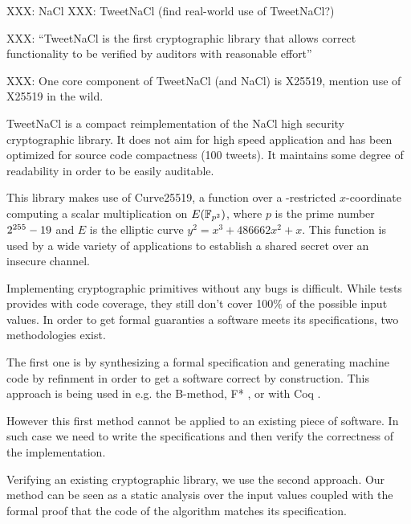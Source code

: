 XXX: NaCl
XXX: TweetNaCl (find real-world use of TweetNaCl?)

XXX: 
``TweetNaCl is the
first cryptographic library that allows correct functionality to be verified
by auditors with reasonable effort''

XXX: One core component of TweetNaCl (and NaCl) is X25519, mention use
of X25519 in the wild.



TweetNaCl\cite{BGJ+15} is a compact reimplementation of the
NaCl\cite{BLS12} high security cryptographic library.
It does not aim for high speed application and has been optimized for source
code compactness (100 tweets). It maintains some degree of readability in order
to be easily auditable.

This library makes use of Curve25519\cite{Ber06}, a function over a -restricted
$x$-coordinate computing a scalar multiplication on $E(\mathbb{F}_{p^2})$, where $p$ is
the prime number $2^{255}-19$ and $E$ is the elliptic curve $y^2 = x^3 + 486662 x^2 + x$.
This function is used by a wide variety of applications\cite{this-that-use-curve25519}
to establish a shared secret over an insecure channel.

Implementing cryptographic primitives without any bugs is difficult.
While tests provides with code coverage, they still don't cover 100\% of the
possible input values. In order to get formal guaranties a software meets its
specifications, two methodologies exist.

The first one is by synthesizing a formal specification and generating machine
code by refinment in order to get a software correct by construction.
This approach is being used in e.g. the B-method\cite{Abrial:1996:BAP:236705},
F* \cite{DBLP:journals/corr/BhargavanDFHPRR17}, or with Coq \cite{CpdtJFR}.

However this first method cannot be applied to an existing piece of software.
In such case we need to write the specifications and then verify the correctness
of the implementation.




Verifying an existing cryptographic library, we use the second approach.
Our method can be seen as a static analysis over the input values coupled
with the formal proof that the code of the algorithm matches its specification.


